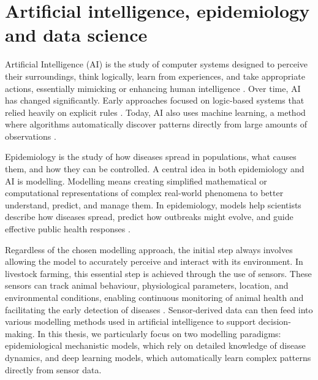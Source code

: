 




\section{Artificial intelligence, epidemiology and data science}

Artificial Intelligence (AI) is the study of computer systems designed to perceive their surroundings, think logically, learn from experiences, and take appropriate actions, essentially mimicking or enhancing human intelligence \cite{russell2020artificial}. Over time, AI has changed significantly. Early approaches focused on logic-based systems that relied heavily on explicit rules  \cite{nilsson2009quest}. Today, AI also uses machine learning, a method where algorithms automatically discover patterns directly from large amounts of observations \cite{Goodfellow-et-al-2016}.

Epidemiology is the study of how diseases spread in populations, what causes them, and how they can be controlled. A central idea in both epidemiology and AI is modelling. Modelling means creating simplified mathematical or computational representations of complex real-world phenomena to better understand, predict, and manage them. In epidemiology, models help scientists describe how diseases spread, predict how outbreaks might evolve, and guide effective public health responses \cite{keeling2008modeling}.

Regardless of the chosen modelling approach, the initial step always involves allowing the model to accurately perceive and interact with its environment. In livestock farming, this essential step is achieved through the use of sensors. These sensors can track animal behaviour, physiological parameters, location, and environmental conditions, enabling continuous monitoring of animal health and facilitating the early detection of diseases \cite{berckmans2017general}. Sensor-derived data can then feed into various modelling methods used in artificial intelligence to support decision-making. In this thesis, we particularly focus on two modelling paradigms: epidemiological mechanistic models, which rely on detailed knowledge of disease dynamics, and deep learning models, which automatically learn complex patterns directly from sensor data.


